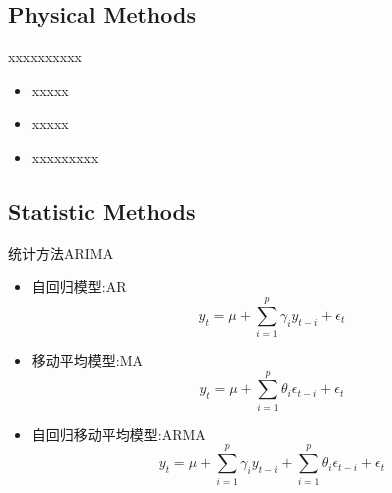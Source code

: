 \documentclass{ctexbeamer}
\begin{document}
\subsection{Physical Methods}

    \begin{frame}{xxxx}{xxxxxx}
        \begin{itemize}
        \item
        xxxxx
        \item
        xxxxx
        \item
        xxxxxxxxx
        \end{itemize}
    \end{frame}

\subsection{Statistic Methods}
    \begin{frame}{统计方法}{ARIMA}
        \begin{itemize}
        \item 
        自回归模型:AR
        \begin{equation}
            y_t = \mu + \sum_{i=1}^{p}\gamma_i y_{t-i} + \epsilon_t
        \end{equation}

        \item 
        移动平均模型:MA
        \begin{equation}
            y_t = \mu + \sum_{i=1}^{p}\theta_i \epsilon_{t-i} + \epsilon_t
        \end{equation}

        \item 
        自回归移动平均模型:ARMA
        \begin{equation}
            y_t = \mu + \sum_{i=1}^{p}\gamma_i y_{t-i} + \sum_{i=1}^{p}\theta_i \epsilon_{t-i} + \epsilon_t
        \end{equation}

        \end{itemize}

    \end{frame}
\end{document}
